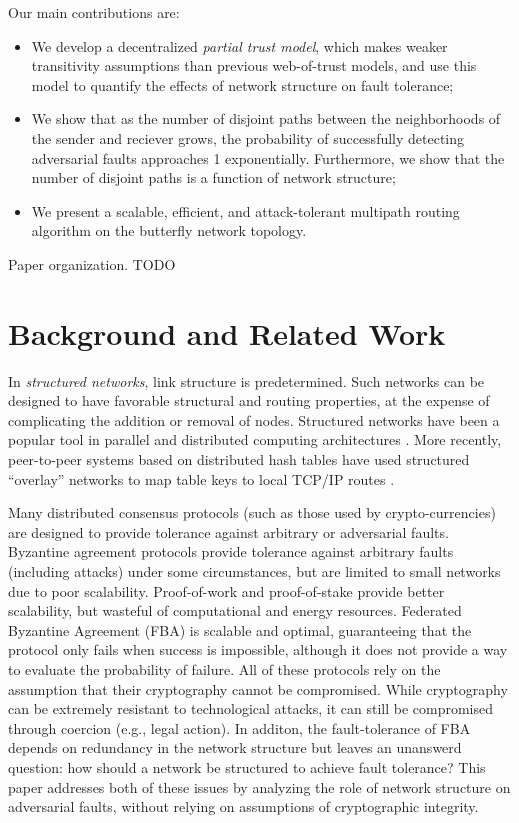 \documentclass[prodmode,permissions]{acmsmall-ec16}
\begin{document}
Our main contributions are:
\begin{itemize}
\item{We develop a decentralized {\em partial trust model},
which makes weaker transitivity assumptions than previous web-of-trust models,
and use this model to quantify the effects of network structure on
fault tolerance;}
\item{We show that as the number of disjoint paths between the neighborhoods
of the sender and reciever grows,
the probability of successfully detecting adversarial faults
approaches 1 exponentially.
Furthermore, we show that the number of disjoint paths is a function of
network structure;}
\item{We present a scalable, efficient, and attack-tolerant multipath
routing algorithm on the butterfly network topology.}
\end{itemize}

Paper organization. TODO

\section{Background and Related Work}

In {\em structured networks}, link structure is predetermined.
Such networks can be designed to have favorable structural and routing properties,
at the expense of complicating the addition or removal of nodes.
Structured networks have been a popular tool in parallel and distributed
computing architectures \cite{kshemkalyani_distributed_2008}.
More recently, peer-to-peer systems based on distributed hash tables have used
structured ``overlay'' networks to map table keys to local TCP/IP routes
\cite{lua_survey_2005,korzun_structured_2013}.

Many distributed consensus protocols (such as those used by crypto-currencies)
are designed to provide tolerance against arbitrary or adversarial faults.
Byzantine agreement protocols
\cite{lamport_byzantine_1982,castro_practical_1999}
provide tolerance against arbitrary faults (including attacks) under
some circumstances, but are limited to small networks due to poor scalability.
Proof-of-work \cite{dwork_pricing_1993,nakamoto_bitcoin:_2008}
and proof-of-stake \cite{king_ppcoin:_2012}
provide better scalability, but wasteful of computational and energy
resources.
Federated Byzantine Agreement (FBA) \cite{mazieres_stellar_2015}
is scalable and optimal, guaranteeing that the protocol only fails when
success is impossible, although it does not provide a way to evaluate
the probability of failure.
All of these protocols rely on the assumption that their cryptography
cannot be compromised.
While cryptography can be extremely resistant to technological attacks,
it can still be compromised through coercion (e.g., legal action).
In additon, the fault-tolerance of FBA depends on redundancy in the network structure
but leaves an unanswerd question: how should a network be structured to achieve
fault tolerance?
This paper addresses both of these issues by analyzing the role of network
structure on adversarial faults, without relying on assumptions of cryptographic
integrity.
\end{document}
